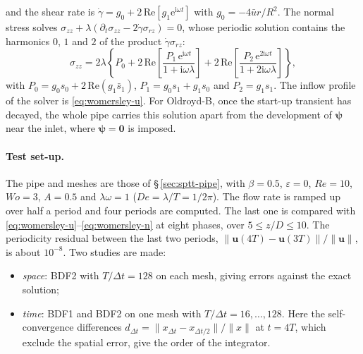 and the shear rate is $\dot\gamma=g_0+2\,\mathrm{Re}[g_1\mathrm{e}^{\mathrm{i}\omega t}]$
with $g_0=-4\bar u r/R^2$. The normal stress solves
$\sigma_{zz}+\lambda(\partial_t\sigma_{zz}-2\dot\gamma\sigma_{rz})=0$, whose
periodic solution contains the harmonics $0$, $1$ and $2$ of the product
$\dot\gamma\sigma_{rz}$:
\begin{equation}
  \sigma_{zz} = 2\lambda\left\{P_0
    + 2\,\mathrm{Re}\!\left[\frac{P_1\,\mathrm{e}^{\mathrm{i}\omega t}}{1+\mathrm{i}\omega\lambda}\right]
    + 2\,\mathrm{Re}\!\left[\frac{P_2\,\mathrm{e}^{2\mathrm{i}\omega t}}{1+2\mathrm{i}\omega\lambda}\right]\right\},
  \label{eq:womersley-n}
\end{equation}
with $P_0=g_0s_0+2\,\mathrm{Re}(g_1\bar s_1)$, $P_1=g_0s_1+g_1s_0$ and
$P_2=g_1s_1$. The inflow profile of the solver is
\eqref{eq:womersley-u}. For Oldroyd-B, once the start-up transient has
decayed, the whole pipe carries this solution apart from the development of
$\boldsymbol{\psi}$ near the inlet, where $\boldsymbol{\psi}=\boldsymbol{0}$
is imposed.

\paragraph{Test set-up.}
The pipe and meshes are those of \S\,\ref{sec:sptt-pipe}, with $\beta=0.5$,
$\varepsilon=0$, $\mathit{Re}=10$, $\mathit{Wo}=3$, $A=0.5$ and
$\lambda\omega=1$ ($\mathit{De}=\lambda/T=1/2\pi$). The flow rate is ramped up
over half a period and four periods are computed. The last one is compared
with \eqref{eq:womersley-u}--\eqref{eq:womersley-n} at eight phases, over
$5\le z/D\le 10$. The periodicity residual between the last two periods,
$\|\boldsymbol{u}(4T)-\boldsymbol{u}(3T)\|/\|\boldsymbol{u}\|$, is about
$10^{-8}$. Two studies are made:
\begin{itemize}
  \item \emph{space}: BDF2 with $T/\Delta t=128$ on each mesh, giving errors
    against the exact solution;
  \item \emph{time}: BDF1 and BDF2 on one mesh with $T/\Delta t=16,\dots,128$.
    Here the self-convergence differences
    $d_{\Delta t}=\|x_{\Delta t}-x_{\Delta t/2}\|/\|x\|$ at $t=4T$, which
    exclude the spatial error, give the order of the integrator.
\end{itemize}

